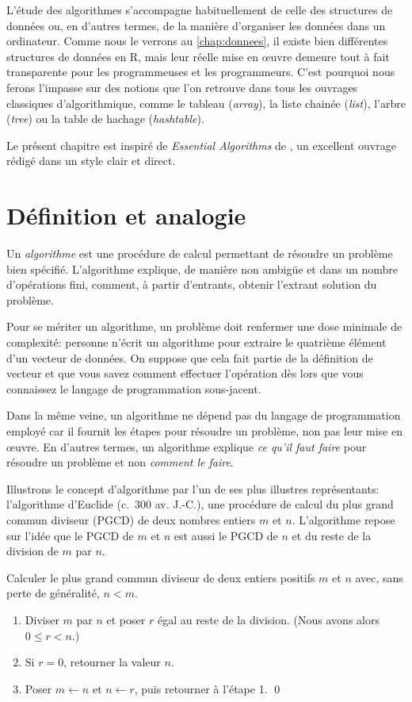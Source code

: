 L'étude des algorithmes s'accompagne habituellement de celle des
structures de données ou, en d'autres termes, de la manière
d'organiser les données dans un ordinateur. Comme nous le verrons au
\autoref{chap:donnees}, il existe bien différentes structures de
données en R, mais leur réelle mise en œuvre demeure tout à fait
transparente pour les programmeuses et les programmeurs. C'est
pourquoi nous ferons l'impasse sur des notions que l'on retrouve dans
tous les ouvrages classiques d'algorithmique, comme le tableau
(\emph{array}), la liste chainée (\emph{list}), l'arbre (\emph{tree})
ou la table de hachage (\emph{hashtable}).

Le présent chapitre est inspiré de \emph{Essential Algorithms} de
\citet{Stephens:algorithms:2013}, un excellent ouvrage rédigé dans un
style clair et direct.

\section{Définition et analogie}
\label{sec:algorithmes:definition}

Un \emph{algorithme} est une procédure de calcul
permettant de résoudre un problème bien spécifié. L'algorithme
explique, de manière non ambigüe et dans un nombre d'opérations fini,
comment, à partir d'entrants, obtenir l'extrant solution du problème.

Pour se mériter un algorithme, un problème doit renfermer une dose
minimale de complexité: personne n'écrit un algorithme pour extraire
le quatrième élément d'un vecteur de données. On suppose que cela fait
partie de la définition de vecteur et que vous savez comment effectuer
l'opération dès lors que vous connaissez le langage de programmation
sous-jacent.

Dans la même veine, un algorithme ne dépend pas du langage de
programmation employé car il fournit les étapes pour résoudre un
problème, non pas leur mise en œuvre. En d'autres termes, un
algorithme explique \emph{ce qu'il faut faire} pour résoudre un
problème et non \emph{comment le faire}.

Illustrons le concept d'algorithme par l'un de ses plus illustres
représentants: l'algorithme d'Euclide (c.~300 av. J.-C.), une procédure
de calcul du plus grand commun diviseur (PGCD) de deux nombres entiers
$m$ et $n$. L'algorithme repose sur l'idée que le PGCD de $m$ et $n$
est aussi le PGCD de $n$ et du reste de la division de $m$ par $n$.

\begin{algorithme}
  \label{algo:algorithmes:euclide}
  Calculer le plus grand commun diviseur de deux entiers positifs $m$
  et $n$ avec, sans perte de généralité, $n < m$.
  \begin{enumerate}
  \item Diviser $m$ par $n$ et poser $r$ égal au reste de la division.
    (Nous avons alors $0 \leq r < n$.)
  \item Si $r = 0$, retourner la valeur $n$.
  \item Poser $m \leftarrow n$ et $n \leftarrow r$, puis retourner à
    l'étape 1. \qed
  \end{enumerate}
\end{algorithme}

